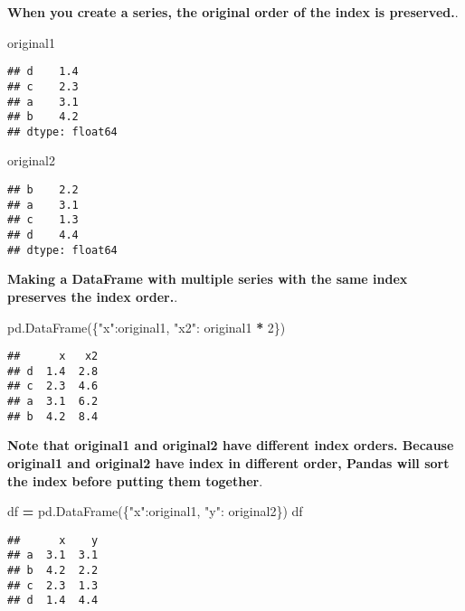 \documentclass[
]{book}
\newenvironment{Shaded}{\begin{snugshade}}{\end{snugshade}}
\newcommand{\DecValTok}[1]{\textcolor[rgb]{0.00,0.00,0.81}{#1}}
\newcommand{\NormalTok}[1]{#1}
\newcommand{\OperatorTok}[1]{\textcolor[rgb]{0.81,0.36,0.00}{\textbf{#1}}}
\newcommand{\StringTok}[1]{\textcolor[rgb]{0.31,0.60,0.02}{#1}}
\begin{document}
{\textbf{When you create a series, the original order of the index is preserved.}}.

\begin{Shaded}
\begin{Highlighting}[]
\NormalTok{original1}
\end{Highlighting}
\end{Shaded}

\begin{verbatim}
## d    1.4
## c    2.3
## a    3.1
## b    4.2
## dtype: float64
\end{verbatim}

\begin{Shaded}
\begin{Highlighting}[]
\NormalTok{original2}
\end{Highlighting}
\end{Shaded}

\begin{verbatim}
## b    2.2
## a    3.1
## c    1.3
## d    4.4
## dtype: float64
\end{verbatim}

{\textbf{Making a DataFrame with multiple series with the same index preserves the index order.}}.

\begin{Shaded}
\begin{Highlighting}[]
\NormalTok{pd.DataFrame(\{}\StringTok{"x"}\NormalTok{:original1, }\StringTok{"x2"}\NormalTok{: original1 }\OperatorTok{*} \DecValTok{2}\NormalTok{\})}
\end{Highlighting}
\end{Shaded}

\begin{verbatim}
##      x   x2
## d  1.4  2.8
## c  2.3  4.6
## a  3.1  6.2
## b  4.2  8.4
\end{verbatim}

{\textbf{Note that original1 and original2 have different index orders. Because original1 and original2 have index in different order, Pandas will sort the index before putting them together}}.

\begin{Shaded}
\begin{Highlighting}[]
\NormalTok{df }\OperatorTok{=}\NormalTok{ pd.DataFrame(\{}\StringTok{"x"}\NormalTok{:original1, }\StringTok{"y"}\NormalTok{: original2\})}
\NormalTok{df}
\end{Highlighting}
\end{Shaded}

\begin{verbatim}
##      x    y
## a  3.1  3.1
## b  4.2  2.2
## c  2.3  1.3
## d  1.4  4.4
\end{verbatim}
\end{document}
